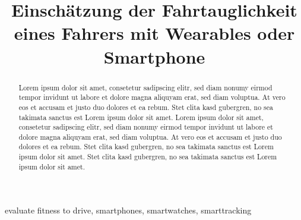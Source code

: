 \documentclass[conference]{IEEEtran}
\begin{document}
\title{Einschätzung der Fahrtauglichkeit eines Fahrers mit Wearables oder Smartphone}

\author{
}

\maketitle

\begin{abstract}
Lorem ipsum dolor sit amet, consetetur sadipscing elitr, sed diam nonumy eirmod tempor invidunt ut labore et dolore magna aliquyam erat, sed diam voluptua. At vero eos et accusam et justo duo dolores et ea rebum. Stet clita kasd gubergren, no sea takimata sanctus est Lorem ipsum dolor sit amet. Lorem ipsum dolor sit amet, consetetur sadipscing elitr, sed diam nonumy eirmod tempor invidunt ut labore et dolore magna aliquyam erat, sed diam voluptua. At vero eos et accusam et justo duo dolores et ea rebum. Stet clita kasd gubergren, no sea takimata sanctus est Lorem ipsum dolor sit amet. Stet clita kasd gubergren, no sea takimata sanctus est Lorem ipsum dolor sit amet.
\end{abstract}

\begin{IEEEkeywords}
evaluate fitness to drive, smartphones, smartwatches, smarttracking
\end{IEEEkeywords}








\end{document}

